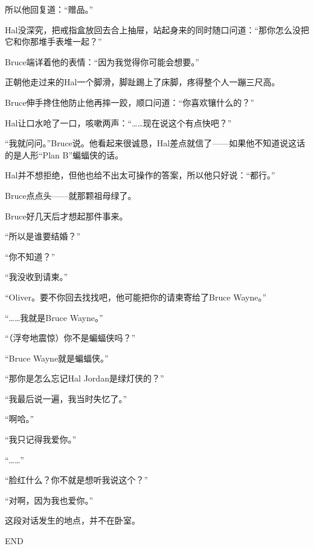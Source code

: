\documentclass[../main.tex]{subfiles}
\begin{document}
所以他回复道：“赠品。”

Hal没深究，把戒指盒放回去合上抽屉，站起身来的同时随口问道：“那你怎么没把它和你那堆手表堆一起？”

Bruce端详着他的表情：“因为我觉得你可能会想要。”

正朝他走过来的Hal一个脚滑，脚趾踢上了床脚，疼得整个人一蹦三尺高。

Bruce伸手搀住他防止他再摔一跤，顺口问道：“你喜欢镶什么的？”

Hal让口水呛了一口，咳嗽两声：“\ldots\ldots 现在说这个有点快吧？”

“我就问问。”Bruce说。他看起来很诚恳，Hal差点就信了——如果他不知道说这话的是人形“Plan
B”蝙蝠侠的话。

Hal并不想拒绝，但他也给不出太可操作的答案，所以他只好说：“都行。”

Bruce点点头——就那颗祖母绿了。

Bruce好几天后才想起那件事来。

“所以是谁要结婚？”

“你不知道？”

“我没收到请柬。”

“Oliver。要不你回去找找吧，他可能把你的请柬寄给了Bruce Wayne。”

“\ldots\ldots 我就是Bruce Wayne。”

“（浮夸地震惊）你不是蝙蝠侠吗？”

“Bruce Wayne就是蝙蝠侠。”

“那你是怎么忘记Hal Jordan是绿灯侠的？”

“我最后说一遍，我当时失忆了。”

“啊哈。”

“我只记得我爱你。”

“\ldots\ldots”

“脸红什么？你不就是想听我说这个？”

“对啊，因为我也爱你。”

这段对话发生的地点，并不在卧室。

END
\end{document}
